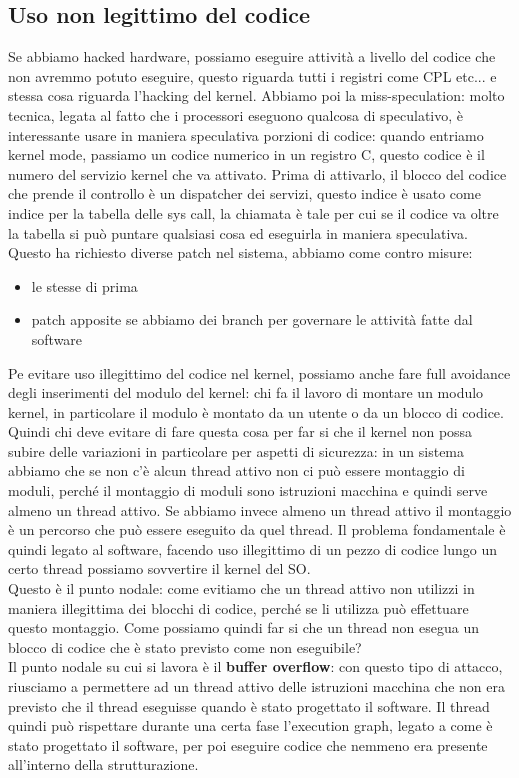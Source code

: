 \documentclass[12pt, oneside]{extbook}
\begin{document}
\subsection{Uso non legittimo del codice}
Se abbiamo hacked hardware, possiamo eseguire attività a livello del codice che non avremmo potuto eseguire, questo riguarda tutti i registri come CPL etc... e stessa cosa riguarda l'hacking del kernel. Abbiamo poi la miss-speculation: molto tecnica, legata al fatto che i processori eseguono qualcosa di speculativo, è interessante usare in maniera speculativa porzioni di codice: quando entriamo kernel mode, passiamo un codice numerico in un registro C, questo codice è il numero del servizio kernel che va attivato. Prima di attivarlo, il blocco del codice che prende il controllo è un dispatcher dei servizi, questo indice è usato come indice per la tabella delle sys call, la chiamata è tale per cui se il codice va oltre la tabella si può puntare qualsiasi cosa ed eseguirla in maniera speculativa. Questo ha richiesto diverse patch nel sistema, abbiamo come contro misure:
\begin{itemize}
	\item le stesse di prima
	\item patch apposite se abbiamo dei branch per governare le attività fatte dal software
\end{itemize}
Pe evitare uso illegittimo del codice nel kernel, possiamo anche fare full avoidance degli inserimenti del modulo del kernel: chi fa il lavoro di montare un modulo kernel, in particolare il modulo è montato da un utente o da un blocco di codice. Quindi chi deve evitare di fare questa cosa per far si che il kernel non possa subire delle variazioni in particolare per aspetti di sicurezza: in un sistema abbiamo che se non c'è alcun thread attivo non ci può essere montaggio di moduli, perché il montaggio di moduli sono istruzioni macchina e quindi serve almeno un thread attivo. Se abbiamo invece almeno un thread attivo il montaggio è un percorso che può essere eseguito da quel thread. Il problema fondamentale è quindi legato al software, facendo uso illegittimo di un pezzo di codice lungo un certo thread possiamo sovvertire il kernel del SO.\\Questo è il punto nodale: come evitiamo che un thread attivo non utilizzi in maniera illegittima dei blocchi di codice, perché se li utilizza può effettuare questo montaggio. Come possiamo quindi far si che un thread non esegua un blocco di codice che è stato previsto come non eseguibile?\\Il punto nodale su cui si lavora è il \textbf{buffer overflow}: con questo tipo di attacco, riusciamo a permettere ad un thread attivo delle istruzioni macchina che non era previsto che il thread eseguisse quando è stato progettato il software. Il thread quindi può rispettare durante una certa fase l'execution graph, legato a come è stato progettato il software, per poi eseguire codice che nemmeno era presente all'interno della strutturazione.
\end{document}
